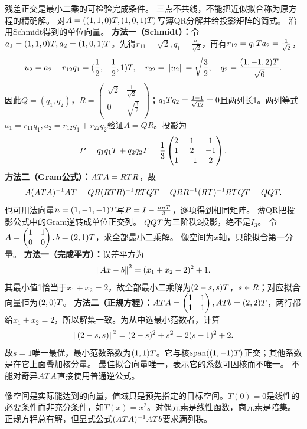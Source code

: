 {残差正交是最小二乘的可检验完成条件。}
{三点不共线，不能把近似拟合称为原方程的精确解。}
{对$A=((1,1,0)T,(1,0,1)T)$写薄QR分解并给投影矩阵的简式。}
{沿用Schmidt得到的单位向量。}
{\textbf{方法一（Schmidt）：}令$a_1=(1,1,0)T,a_2=(1,0,1)T$。先得$r_{11}=\sqrt2,q_1=\frac{a_1}{\sqrt2}$，再有$r_{12}=q_1T a_2=\frac{1}{\sqrt2}$，
\[u_2=a_2-r_{12}q_1=(\dfrac{1}{2},-\dfrac{1}{2},1)T,\quad
r_{22}=\left\lVert u_2\right\rVert=\sqrt{\frac{3}{2}},\quad q_2=\dfrac{(1,-1,2)T}{\sqrt6}.\]
因此$Q=(q_1,q_2)$，$R=\begin{pmatrix}\sqrt2&\frac{1}{\sqrt2}\\0&\sqrt{\frac{3}{2}}\end{pmatrix}$；$q_1T q_2=\frac{1-1}{\sqrt{12}}=0$且两列长1。两列等式$a_1=r_{11}q_1,a_2=r_{12}q_1+r_{22}q_2$验证$A=QR$。投影为
\[P=q_1q_1T+q_2q_2T=\dfrac13\begin{pmatrix}2&1&1\\1&2&-1\\1&-1&2\end{pmatrix}.\]
\textbf{方法二（Gram公式）：}$AT A=RT R$，故
\[A(AT A)^{-1} AT=QR(RT R)^{-1} RT QT
=QRR^{-1}(RT)^{-1} RT QT=QQT.\]
也可用法向量$n=(1,-1,-1)T$写$P=I-\frac{nnT}{3}$，逐项得到相同矩阵。}
{薄QR把投影公式中的Gram逆转成单位正交列。}
{$QQT$为三阶秩2投影，绝不是$I_3$。}
{令$A=\begin{pmatrix}1&1\\0&0\end{pmatrix},b=(2,1)T$，求全部最小二乘解。}
{像空间为$x$轴，只能拟合第一分量。}
{\textbf{方法一（完成平方）：}误差平方为
\[\left\lVert Ax-b\right\rVert^2=(x_1+x_2-2)^2+1.\]
其最小值1恰当于$x_1+x_2=2$，故全部最小二乘解为$(2-s,s)T$，$s\in R$；对应拟合向量恒为$(2,0)T$。
\textbf{方法二（正规方程）：}$AT A=\begin{pmatrix}1&1\\1&1\end{pmatrix},ATb=(2,2)T$，两行都给$x_1+x_2=2$，所以解集一致。为从中选最小范数者，计算
\[\left\lVert(2-s,s)\right\rVert^2=(2-s)^2+s^2=2(s-1)^2+2.\]
故$s=1$唯一最优，最小范数系数为$(1,1)T$。它与核$\operatorname{span}((1,-1)T)$正交；其他系数是在它上面叠加核分量。}
{最佳拟合向量唯一，表示它的系数可因核而不唯一。}
{不能对奇异$AT A$直接使用普通逆公式。}


\begin{warning}
像空间是实际能达到的向量，值域只是预先指定的目标空间。$T(0)=0$是线性的必要条件而非充分条件，如$T(x)=x^2$。对偶元素是线性函数，商元素是陪集。正规方程总有解，但显式公式$(AT A)^{-1} ATb$要求满列秩。
\end{warning}
